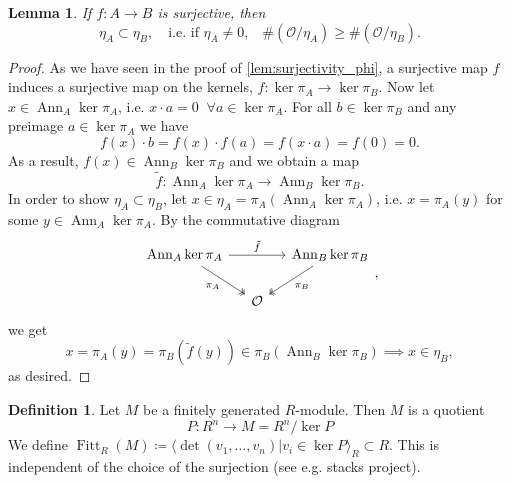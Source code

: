 \documentclass{article}
\theoremstyle{plain}%
\newtheorem{lemma}{Lemma}[section]
\theoremstyle{definition}
\newtheorem{definition}{Definition}[section]
\theoremstyle{remark}
\newcommand{\ann}{\operatorname{Ann}}
\newcommand{\fitt}{\operatorname{Fitt}}
\begin{document}
\begin{lemma}\label{lem:surjectivity_eta}
    If \(f \colon A \to B\) is surjective, then
    \begin{equation}
        \eta_A \subset \eta_B, \quad \text{i.e. if \(\eta_A \neq 0\),}\quad \#(\mathcal{O}/\eta_A) \geq \#(\mathcal{O}/\eta_B).  
    \end{equation}
\end{lemma}
\begin{proof}
    As we have seen in the proof of \cref{lem:surjectivity_phi}, a surjective map \(f\) induces a surjective
    map on the kernels, \(f\colon \ker \pi_A \to \ker\pi_B\).
    Now let \(x \in \ann_A \ker \pi_A\), i.e. \(x \cdot a = 0\;\; \forall a \in \ker \pi_A\).
    For all \(b \in \ker \pi_B\) and any preimage \(a \in \ker \pi_A\) we have
    \[
        f(x) \cdot b = f(x) \cdot f(a) = f(x \cdot a) = f(0) = 0.
    \]
    As a result, \(f(x) \in \ann_B\ker \pi_B\) and we obtain a map
    \[
        \tilde f\colon\ann_A\ker \pi_A \to \ann_B \ker \pi_B.  
    \]
    In order to show \(\eta_A \subset \eta_B\), let \(x \in \eta_A = \pi_A(\ann_A \ker \pi_A)\), i.e.
    \(x = \pi_A(y)\) for some \(y \in \ann_A \ker \pi_A\). By the commutative diagram
    \[
    \begin{tikzcd}[column sep=small]
        \ann_A \ker \pi_A \arrow[rr, "\tilde f"] \arrow [dr, "\pi_A", swap, twoheadrightarrow] 
        & & \ann_B \ker \pi_B \arrow [dl, "\pi_B", twoheadrightarrow]\\
        & \mathcal{O} &
    \end{tikzcd},
    \]
    we get
    \[
        x = \pi_A(y) = \pi_B(\tilde f(y)) \in \pi_B(\ann_B \ker \pi_B) \implies x \in \eta_B,
    \]
    as desired.
\end{proof}

\begin{definition}
    Let \(M\) be a finitely generated \(R\)-module. Then \(M\) is a quotient
    \[
        P \colon R^n \longrightarrow M = R^n/\ker P
    \]
    We define \(\fitt_R(M) \coloneqq \langle \det(v_1, \dots, v_n) | v_i \in \ker P \rangle_R \subset R\).
    This is independent of the choice of the surjection (see e.g. stacks project).
\end{definition}
\end{document}
